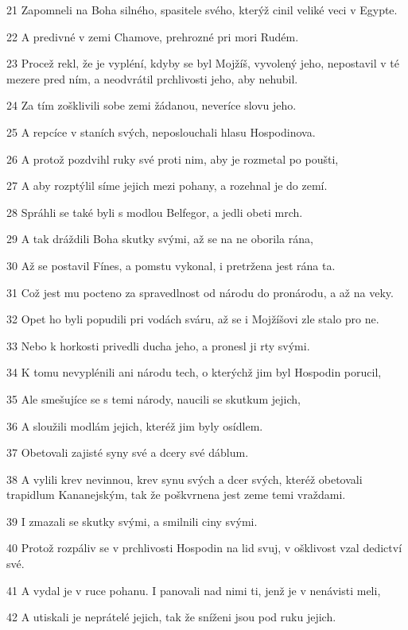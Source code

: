 \par 21 Zapomneli na Boha silného, spasitele svého, kterýž cinil veliké veci v Egypte.
\par 22 A predivné v zemi Chamove, prehrozné pri mori Rudém.
\par 23 Procež rekl, že je vypléní, kdyby se byl Mojžíš, vyvolený jeho, nepostavil v té mezere pred ním, a neodvrátil prchlivosti jeho, aby nehubil.
\par 24 Za tím zošklivili sobe zemi žádanou, neveríce slovu jeho.
\par 25 A repcíce v staních svých, neposlouchali hlasu Hospodinova.
\par 26 A protož pozdvihl ruky své proti nim, aby je rozmetal po poušti,
\par 27 A aby rozptýlil síme jejich mezi pohany, a rozehnal je do zemí.
\par 28 Spráhli se také byli s modlou Belfegor, a jedli obeti mrch.
\par 29 A tak dráždili Boha skutky svými, až se na ne oborila rána,
\par 30 Až se postavil Fínes, a pomstu vykonal, i pretržena jest rána ta.
\par 31 Což jest mu pocteno za spravedlnost od národu do pronárodu, a až na veky.
\par 32 Opet ho byli popudili pri vodách sváru, až se i Mojžíšovi zle stalo pro ne.
\par 33 Nebo k horkosti privedli ducha jeho, a pronesl ji rty svými.
\par 34 K tomu nevyplénili ani národu tech, o kterýchž jim byl Hospodin porucil,
\par 35 Ale smešujíce se s temi národy, naucili se skutkum jejich,
\par 36 A sloužili modlám jejich, kteréž jim byly osídlem.
\par 37 Obetovali zajisté syny své a dcery své dáblum.
\par 38 A vylili krev nevinnou, krev synu svých a dcer svých, kteréž obetovali trapidlum Kananejským, tak že poškvrnena jest zeme temi vraždami.
\par 39 I zmazali se skutky svými, a smilnili ciny svými.
\par 40 Protož rozpáliv se v prchlivosti Hospodin na lid svuj, v ošklivost vzal dedictví své.
\par 41 A vydal je v ruce pohanu. I panovali nad nimi ti, jenž je v nenávisti meli,
\par 42 A utiskali je neprátelé jejich, tak že sníženi jsou pod ruku jejich.
